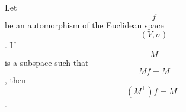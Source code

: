 Let $$f$$ be an automorphism of the Euclidean space $$(V, \sigma)$$. If $$M$$ is a subspace such that $$Mf = M$$, then $$(M^\perp)f = M^\perp$$.
